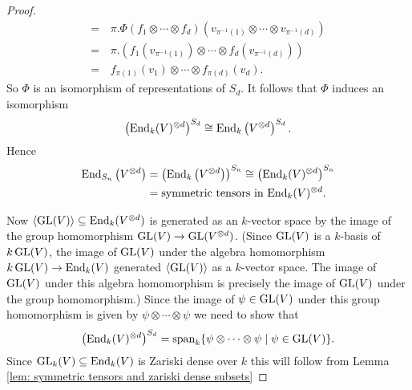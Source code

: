 \begin{proof}
\begin{align*}
    =&\, \pi.\Phi(f_1 \otimes \dotsb \otimes f_d)\left( v_{\pi^{-1}(1)} \otimes \dotsb \otimes v_{\pi^{-1}(d)} \right) \\
    =&\, \pi.\left( f_1\left(v_{\pi^{-1}(1)}\right) \otimes \dotsb \otimes f_d\left(v_{\pi^{-1}(d)}\right) \right) \\
    =&\, f_{\pi(1)}(v_1) \otimes \dotsb \otimes f_{\pi(d)}(v_d).
  \end{align*}
  So $\Phi$ is an isomorphism of representations of $S_d$. It follows that $\Phi$ induces an isomorphism
  \[
    \left( \operatorname{End}_k(V)^{\otimes d} \right)^{S_d} \cong \operatorname{End}_k \left(V^{\otimes d}\right)^{S_d}.
  \]
  Hence
  \begin{align*}
    \operatorname{End}_{S_n}\left( V^{\otimes d} \right)
    &= \left( \operatorname{End}_k\left(V^{\otimes d}\right) \right)^{S_n}
    \cong \left( \operatorname{End}_k(V)^{\otimes d} \right)^{S_n} \\
    &= \text{symmetric tensors in $\operatorname{End}_k(V)^{\otimes d}$}.
  \end{align*}
  
  Now $\left\langle \operatorname{GL}(V) \right\rangle \subseteq \operatorname{End}_k(V^{\otimes d})$ is generated as an $k$-vector space by the image of the group homomorphism $\operatorname{GL}(V) \to \operatorname{GL}(V^{\otimes d})$. (Since $\operatorname{GL}(V)$ is a $k$-basis of $k\operatorname{GL}(V)$, the image of $\operatorname{GL}(V)$ under the algebra homomorphism $k \operatorname{GL}(V) \to \operatorname{End}_k(V)$ generated $\left\langle \operatorname{GL}(V) \right\rangle$ as a $k$-vector space. The image of $\operatorname{GL}(V)$ under this algebra homomorphism is precisely the image of $\operatorname{GL}(V)$ under the group homomorphism.) Since the image of $\psi \in \operatorname{GL}(V)$ under this group homomorphism is given by $\psi \otimes \dotsb \otimes \psi$ we need to show that
  \[
    \left( \operatorname{End}_k(V)^{\otimes d} \right)^{S_d} = \operatorname{span}_k \{\psi \otimes \dotsb \otimes \psi \mid \psi \in \operatorname{GL}(V)\}.
  \]
  Since $\operatorname{GL}_k(V) \subseteq \operatorname{End}_k(V)$ is Zariski dense over $k$ this will follow from Lemma \ref{lem: symmetric tensors and zariski dense subsets}
\end{proof}


